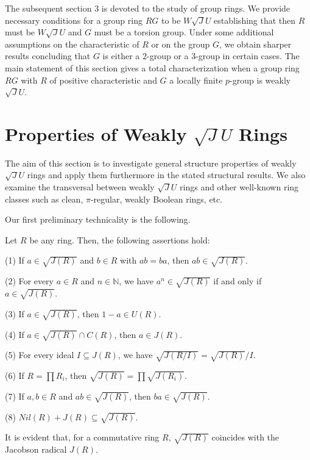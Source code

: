 \documentclass[12pt]{amsart}
\begin{document}
The subsequent section 3 is devoted to the study of group rings. We provide necessary conditions for a group ring \(RG\) to be \(W\sqrt{J}U\) establishing that then \(R\) must be \(W\sqrt{J}U\) and \(G\) must be a torsion group. Under some additional assumptions on the characteristic of \(R\) or on the group \(G\), we obtain sharper results concluding that \(G\) is either a \(2\)-group or a \(3\)-group in certain cases. The main statement of this section gives a total characterization when a group ring \(RG\) with \(R\) of positive characteristic and \(G\) a locally finite \(p\)-group is weakly $\sqrt{J}U$.

\section{Properties of Weakly $\sqrt{J}U$ Rings}

The aim of this section is to investigate general structure properties of weakly $\sqrt{J}U$ rings and apply them furthermore in the stated structural results. We also examine the transversal between weakly $\sqrt{J}U$ rings and other well-known ring classes such as clean, \(\pi\)-regular, weakly Boolean rings, etc.

\medskip

Our first preliminary technicality is the following.

\begin{lemma}\label{1.2}\cite[Lemma 2.1]{DDE}
Let $R$ be any ring. Then, the following assertions hold:

(1) If $a \in \sqrt{J(R)}$ and $b \in R$ with $ab = ba$, then $ab \in \sqrt{J(R)}$. 	

(2) For every $a \in R$ and $n \in \mathbb{N}$, we have $a^n \in \sqrt{J(R)}$ if and only if $a \in \sqrt{J(R)}$.

(3) If $a \in \sqrt{J(R)}$, then $1 - a \in U(R)$. 	

(4) If $a \in \sqrt{J(R)} \cap C(R)$, then $a \in J(R)$.

(5) For every ideal $I \subseteq J(R)$, we have $\sqrt{J(R/I)} = \sqrt{J(R)}/I$.

(6) If $R = \prod R_i$, then $\sqrt{J(R)} = \prod \sqrt{J(R_i)}$.

(7) If $a, b\in R$ and $ab\in \sqrt{J(R)}$, then $ba\in \sqrt{J(R)}$.
	
(8) $Nil(R) + J(R) \subseteq \sqrt{J(R)}$.
\end{lemma}

It is evident that, for a commutative ring \( R \), $\sqrt{J(R)}$ coincides with the Jacobson radical \( J(R)
\).
\end{document}
